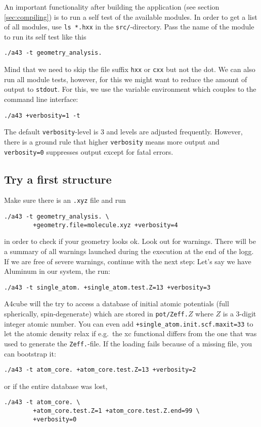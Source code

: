 \documentclass[oribibl]{llncs}
\newcommand{\ttt}[1]{\texttt{#1}}
\newcommand{\codename}{A4cube}
\begin{document}
An important functionality after building the application (see section \ref{sec:compiling}) is to run a self test of the available modules.
In order to get a list of all modules, 
use \ttt{ls *.hxx} in the \ttt{src/}-directory.
Pass the name of the module to run its self test like this
\begin{verbatim}
./a43 -t geometry_analysis.
\end{verbatim}
Mind that we need to skip the file suffix \ttt{hxx} or \ttt{cxx} but not the dot.
We can also run all module tests, however, for this we might want to reduce
the amount of output to \ttt{stdout}. For this, we use the variable environment
which couples to the command line interface:
\begin{verbatim}
./a43 +verbosity=1 -t
\end{verbatim}
The default \ttt{verbosity}-level is $3$ and levels are adjusted frequently.
However, there is a ground rule that higher \ttt{verbosity} means more output
and \ttt{verbosity=0} suppresses output except for fatal errors.

\subsection{Try a first structure}
Make sure there is an \ttt{.xyz} file and run
\begin{verbatim}
./a43 -t geometry_analysis. \
        +geometry.file=molecule.xyz +verbosity=4
\end{verbatim}
in order to check if your geometry looks ok. Look out for warnings.
There will be a summary of all warnings launched during the execution at the end of the logg.
If we are free of severe warnings, continue with the next step:
Let's say we have Aluminum in our system, the run:
\begin{verbatim}
./a43 -t single_atom. +single_atom.test.Z=13 +verbosity=3
\end{verbatim}

\codename{} will the try to access a database of initial atomic potentials
(full spherically, spin-degenerate) which are stored in \ttt{pot/Zeff.}$Z$
where $Z$ is a 3-digit integer atomic number.
You can even add \ttt{+single\_atom.init.scf.maxit=33} to let the atomic density relax if e.g.~the \ac{xc} functional differs from the one that was used to generate the \ttt{Zeff.}-file.
If the loading fails because of a missing file, you can bootstrap it:
\begin{verbatim}
./a43 -t atom_core. +atom_core.test.Z=13 +verbosity=2
\end{verbatim}
or if the entire database was lost,
\begin{verbatim}
./a43 -t atom_core. \
        +atom_core.test.Z=1 +atom_core.test.Z.end=99 \
        +verbosity=0
\end{verbatim}
\end{document}
